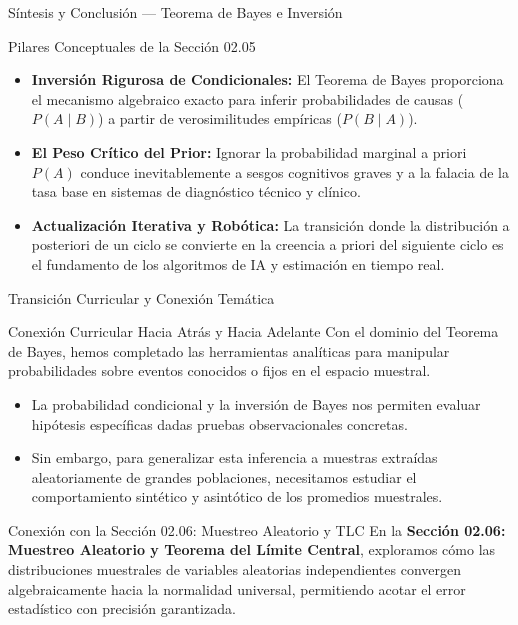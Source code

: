 \documentclass[10pt, aspectratio=169]{beamer}
\begin{document}
\begin{frame}{Síntesis y Conclusión --- Teorema de Bayes e Inversión}
  \fontsize{7.5pt}{9pt}\selectfont
  \begin{block}{Pilares Conceptuales de la Sección 02.05}
    \fontsize{7.5pt}{9pt}\selectfont
    \begin{itemize}\itemsep=0.12cm
      \item \textbf{Inversión Rigurosa de Condicionales:} El Teorema de Bayes proporciona el mecanismo algebraico exacto para inferir probabilidades de causas ($P(A \mid B)$) a partir de verosimilitudes empíricas ($P(B \mid A)$).
      \item \textbf{El Peso Crítico del Prior:} Ignorar la probabilidad marginal a priori $P(A)$ conduce inevitablemente a sesgos cognitivos graves y a la falacia de la tasa base en sistemas de diagnóstico técnico y clínico.
      \item \textbf{Actualización Iterativa y Robótica:} La transición donde la distribución a posteriori de un ciclo se convierte en la creencia a priori del siguiente ciclo es el fundamento de los algoritmos de IA y estimación en tiempo real.
    \end{itemize}
  \end{block}
\end{frame}

\begin{frame}{Transición Curricular y Conexión Temática}
  \fontsize{7.5pt}{9pt}\selectfont
  \begin{block}{Conexión Curricular Hacia Atrás y Hacia Adelante}
    \fontsize{7.5pt}{9pt}\selectfont
    Con el dominio del Teorema de Bayes, hemos completado las herramientas analíticas para manipular probabilidades sobre eventos conocidos o fijos en el espacio muestral.
    \begin{itemize}\itemsep=0.1cm
      \item La probabilidad condicional y la inversión de Bayes nos permiten evaluar hipótesis específicas dadas pruebas observacionales concretas.
      \item Sin embargo, para generalizar esta inferencia a muestras extraídas aleatoriamente de grandes poblaciones, necesitamos estudiar el comportamiento sintético y asintótico de los promedios muestrales.
    \end{itemize}
  \end{block}
  \vspace{-0.15cm}
  \pause
  \begin{alertblock}{Conexión con la Sección 02.06: Muestreo Aleatorio y TLC}
    \fontsize{7.5pt}{9pt}\selectfont
    En la \textbf{Sección 02.06: Muestreo Aleatorio y Teorema del Límite Central}, exploramos cómo las distribuciones muestrales de variables aleatorias independientes convergen algebraicamente hacia la normalidad universal, permitiendo acotar el error estadístico con precisión garantizada.
  \end{alertblock}
\end{frame}
\end{document}
